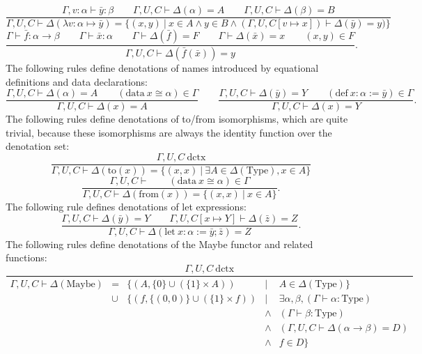 \documentclass[11pt]{article}
\begin{document}
\begin{equation}
	\frac{\Gamma, v : \alpha \vdash \bar{y} : \beta
	\qquad \Gamma,U,C \vdash \Delta(\alpha) = A
	\qquad \Gamma,U,C \vdash \Delta(\beta) = B}
	{\Gamma,U,C \vdash \Delta(\lambda v : \alpha \mapsto \bar{y})
	= \{(x, y)\ |\ x \in A \wedge y \in B
	\wedge (\Gamma,U,C[v \mapsto x])
	\vdash \Delta(\bar{y}) = y)\}}
\end{equation}
\begin{equation}
	\frac{
		\Gamma \vdash \bar{f} : \alpha \to \beta
		\qquad \Gamma \vdash \bar{x} : \alpha
		\qquad \Gamma \vdash \Delta(\bar{f}) = F
		\qquad \Gamma \vdash \Delta(\bar{x}) = x
		\qquad (x,y) \in F
	}{\Gamma,U,C \vdash \Delta(\bar{f}(\bar{x})) = y}.
\end{equation}
The following rules define denotations of names
introduced by equational definitions and data declarations:
\begin{equation}
	\frac{\Gamma,U,C \vdash \Delta(\alpha) = A
	\qquad (\text{data}\ x \cong \alpha) \in \Gamma}
	{\Gamma,U,C \vdash \Delta(x) = A}
	\qquad
	\frac{\Gamma,U,C \vdash \Delta(\bar{y}) = Y
	\qquad (\text{def}\ x : \alpha := \bar{y}) \in \Gamma}
	{\Gamma,U,C \vdash \Delta(x) = Y}.
\end{equation}
The following rules define denotations of to/from isomorphisms,
which are quite trivial, because these isomorphisms are always
the identity function over the denotation set:
\begin{equation}
	\frac{\Gamma,U,C\ \text{dctx}}
	{\Gamma,U,C \vdash \Delta(\text{to}(x)) =
	\{(x,x)\ |\ \exists A \in \Delta(\text{Type}), x \in A\}}
\end{equation}
\begin{equation}
	\frac{\Gamma,U,C \vdash
	\qquad (\text{data}\ x \cong \alpha) \in \Gamma}
	{\Gamma,U,C \vdash \Delta(\text{from}(x)) =
	\{(x,x)\ |\ x \in A\}}.
\end{equation}
The following rule defines denotations of let expressions:
\begin{equation}
	\frac{
		\Gamma,U,C \vdash \Delta(\bar{y}) = Y
		\qquad
		\Gamma,U,C[x \mapsto Y] \vdash \Delta(\bar{z}) = Z
	}{\Gamma,U,C \vdash \Delta(\text{let}\ x : \alpha := \bar{y}; \bar{z})
	= Z}.
\end{equation}
The following rules define denotations of the Maybe functor
and related functions:
\begin{equation}
	\frac{\Gamma,U,C\ \text{dctx}}
	{
		\begin{array}{rclcl}
			\Gamma,U,C \vdash \Delta(\text{Maybe})
			&=
			& \{(A, \{0\} \cup (\{1\} \times A))
			& |
			& A \in \Delta(\text{Type})
			\}
			\\ &\cup
			&\{(f, \{(0,0)\} \cup (\{1\} \times f))
			& |
			& \exists \alpha, \beta, (\Gamma \vdash \alpha : \text{Type})
			\\ &&& \wedge
			& (\Gamma \vdash \beta : \text{Type})
			\\ &&& \wedge
			& (\Gamma,U,C \vdash \Delta(\alpha \to \beta) = D)
			\\ &&& \wedge
			& f \in D\}
		\end{array}
	}
\end{equation}
\end{document}
